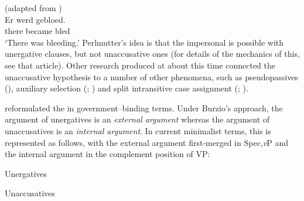 \documentclass[output=paper]{langsci/langscibook}
\begin{document}
\ea {} (adapted from \citealt[131]{Zaenen1993})\\
    \gll  *  Er   werd   gebloed.\\
          {}  there   became   bled\\
    \glt  {}  \enquote*{There was bleeding.}
\z
Perlmutter’s idea is that the impersonal  is possible with unergative
claus\-es, but not unaccusative ones (for details of the mechanics of this, see
that article).  Other research produced at about this time connected the
unaccusative hypothesis to a number of other phenomena, such as pseudopassives
(\citealt[§6.3]{PerlmutterPostal1984}), auxiliary selection
(\citealt{Burzio1981,Burzio1986}; \citealt{Perlmutter1989}) and split
intransitive case assignment (\citealt[165--166]{Perlmutter1978};
\citealt{Harris1981}).

\textcite{Burzio1981,Burzio1986} reformulated the  in
government--binding terms. Under Burzio’s approach, the argument of unergatives
is an \emph{external argument} whereas the argument of unaccusatives is an
\emph{internal argument}. In current minimalist terms, this is represented as
follows, with the external argument first-merged in Spec,\emph{v}P and the
internal argument in the complement position of VP:

\begin{multicols}{2}
\ea
    \ea Unergatives\\
    \ex Unaccusatives\\
    \z
\z
\end{multicols}
\end{document}
